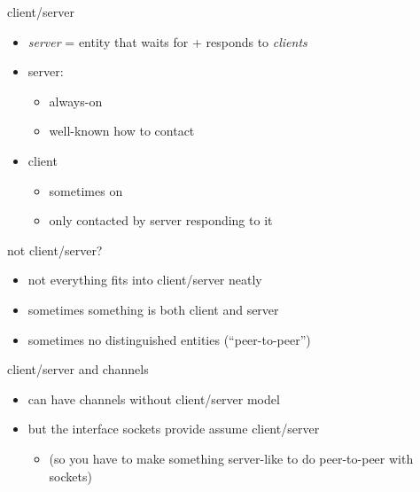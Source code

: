 \begin{frame}{client/server}
    \begin{itemize}
    \item \textit{server} = entity that waits for + responds to \textit{clients}
    \item server:
        \begin{itemize}
        \item always-on
        \item well-known how to contact
        \end{itemize}
    \item client
        \begin{itemize}
        \item sometimes on
        \item only contacted by server responding to it
        \end{itemize}
    \end{itemize}
\end{frame}

\begin{frame}{not client/server?}
    \begin{itemize}
    \item not everything fits into client/server neatly
    \vspace{.5cm}
    \item sometimes something is both client and server
    \item sometimes no distinguished entities (``peer-to-peer'')
    \end{itemize}
\end{frame}

\begin{frame}{client/server and channels}
    \begin{itemize}
    \item can have channels without client/server model
    \vspace{.5cm}
    \item but the interface sockets provide assume client/server
        \begin{itemize}
        \item (so you have to make something server-like to do peer-to-peer with sockets)
        \end{itemize}
    \end{itemize}
\end{frame}
